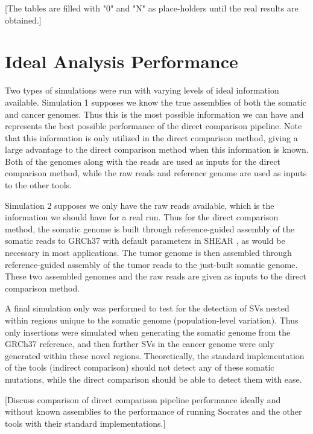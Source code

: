 \documentclass{easychithesis}
\begin{document}
[The tables are filled with "0" and "N" as place-holders until the real results are obtained.]

\section{Ideal Analysis Performance}
Two types of simulations were run with varying levels of ideal information available. Simulation 1 supposes we know the true assemblies of both the somatic and cancer genomes. Thus this is the most possible information we can have and represents the best possible performance of the direct comparison pipeline. Note that this information is only utilized in the direct comparison method, giving a large advantage to the direct comparison method when this information is known. Both of the genomes along with the reads are used as inputs for the direct comparison method, while the raw reads and reference genome are used as inputs to the other tools.

Simulation 2 supposes we only have the raw reads available, which is the information we should have for a real run. Thus for the direct comparison method, the somatic genome is built through reference-guided assembly of the somatic reads to GRCh37 with default parameters in SHEAR \cite{landman2014shear}, as would be necessary in most applications. The tumor genome is then assembled through reference-guided assembly of the tumor reads to the just-built somatic genome. These two assembled genomes and the raw reads are given as inputs to the direct comparison method.

A final simulation only was performed to test for the detection of SVs nested within regions unique to the somatic genome (population-level variation). Thus only insertions were simulated when generating the somatic genome from the GRCh37 reference, and then further SVs in the cancer genome were only generated within these novel regions. Theoretically, the standard implementation of the tools (indirect comparison) should not detect any of these somatic mutations, while the direct comparison should be able to detect them with ease.

[Discuss comparison of direct comparison pipeline performance ideally and without known assemblies to the performance of running Socrates and the other tools with their standard implementations.]
\end{document}
